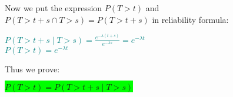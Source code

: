 \documentclass[12pt]{article}
\begin{document}
Now we put the expression \( P(T > t) \) and \( P(T > t+s \cap T > s) = P(T > t+s) \) in reliability formula:

\begin{center}
    \textcolor{teal}{\( P(T > t+s \mid T > s) = \frac{e^{-\lambda(t+s)}}{e^{-\lambda s}} = e^{-\lambda t} \)}
\\[10pt]

    \textcolor{teal}{\( P(T > t) = e^{-\lambda t} \)}
\end{center}

Thus we prove:

\begin{center}
    \colorbox{lime}{\( P(T > t) = P(T > t+s \mid T > s) \)}
\end{center}
\end{document}
